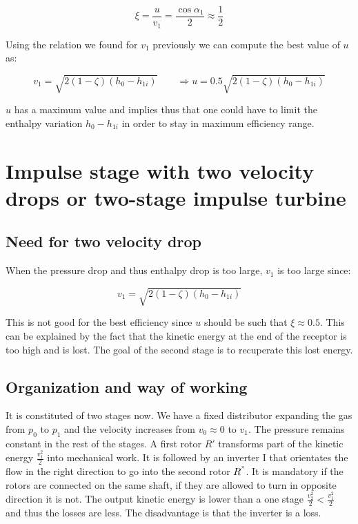 \begin{equation}
\xi = \frac{u}{v_1} = \frac{\cos \alpha _1}{2} \approx \frac{1}{2}
\end{equation}

Using the relation we found for $v_1$ previously we can compute the best value of $u$ as: 

\begin{equation}
v_1 = \sqrt{2 (1-\zeta)(h_0 - h_{1i})} \qquad \Rightarrow u = 0.5\sqrt{2 (1-\zeta)(h_0 - h_{1i})}
\end{equation}

$u$ has a maximum value and implies thus that one could have to limit the enthalpy variation $h_0 - h_{1i}$ in order to stay in maximum efficiency range. 

\section{Impulse stage with two velocity drops or two-stage impulse turbine}
\subsection{Need for two velocity drop}
When the pressure drop and thus enthalpy drop is too large, $v_1$ is too large since: 

\begin{equation}
v_1 =  \sqrt{2 (1-\zeta)(h_0 - h_{1i})} 
\end{equation}

This is not good for the best efficiency since $u$ should be such that $\xi \approx 0.5$. This can be explained by the fact that the kinetic energy at the end of the receptor is too high and is lost. The goal of the second stage is to recuperate this lost energy. 

\subsection{Organization and way of working}
It is constituted of two stages now. We have a fixed distributor expanding the gas from $p_0$ to $p_1$ and the velocity increases from $v_0 \approx 0$ to $v_1$. The pressure remains constant in the rest of the stages. A first rotor $R'$ transforms part of the kinetic energy $\frac{v_1^2}{2}$ into mechanical work. It is followed by an inverter I that orientates the flow in the right direction to go into the second rotor $R^"$. It is mandatory if the rotors are connected on the same shaft, if they are allowed to turn in opposite direction it is not. The output kinetic energy is lower than a one stage $\frac{v_2^2}{2} < \frac{v_1^2}{2}$ and thus the losses are less. The disadvantage is that the inverter is a loss. 

